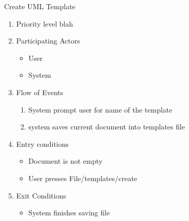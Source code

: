 \documentclass[a4paper, 12pt]{article}
\begin{document}
\item Create UML Template
  \begin {enumerate}
  \item Priority level blah
  \item Participating Actors
    \begin {itemize}
    \item User
    \item System
    \end {itemize}
  \item Flow of Events
    \begin {enumerate}
    \item System prompt user for name of the template
    \item system saves current document into templates file
    \end {enumerate}
  \item Entry conditions
    \begin {itemize}
    \item Document is not empty
    \item User presses File/templates/create
    \end {itemize}
  \item Exit Conditions
    \begin {itemize}
    \item System finishes saving file
    \end {itemize}
  \end {enumerate}
\end{document}
